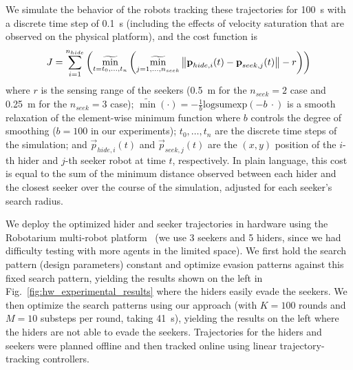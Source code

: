 We simulate the behavior of the robots tracking these trajectories for \SI{100}{s} with a discrete time step of \SI{0.1}{s} (including the effects of velocity saturation that are observed on the physical platform), and the cost function is
\begin{align*}
    J = \sum_{i=1}^{n_{hide}}\left( \mathop{\widetilde{\min}}_{t = t_0, \ldots, t_{n}} \left( \mathop{\widetilde{\min}}_{j=1, \ldots, n_{seek}}\left\lVert\boldsymbol{\mathbf{p}}_{hide, i}(t) - \boldsymbol{\mathbf{p}}_{seek, j}(t)\right\rVert - r \right) \right)
\end{align*}
%
where $r$ is the sensing range of the seekers (\SI{0.5}{m} for the $n_{seek} = 2$ case and \SI{0.25}{m} for the $n_{seek}=3$ case); $\widetilde{\min}(\cdot) = -\frac{1}{b}\text{logsumexp}(-b\ \cdot)$ is a smooth relaxation of the element-wise minimum function where $b$ controls the degree of smoothing ($b=100$ in our experiments); $t_0, \ldots, t_{n}$ are the discrete time steps of the simulation; and $\vec{p}_{hide, i}(t)$ and $\vec{p}_{seek, j}(t)$ are the $(x, y)$ position of the $i$-th hider and $j$-th seeker robot at time $t$, respectively. In plain language, this cost is equal to the sum of the minimum distance observed between each hider and the closest seeker over the course of the simulation, adjusted for each seeker's search radius.

We deploy the optimized hider and seeker trajectories in hardware using the Robotarium multi-robot platform~\cite{wilsonRobotariumGloballyImpactful2020} (we use 3 seekers and 5 hiders, since we had difficulty testing with more agents in the limited space). We first hold the search pattern (design parameters) constant and optimize evasion patterns against this fixed search pattern, yielding the results shown on the left in Fig.~\ref{fig:hw_experimental_results} where the hiders easily evade the seekers. We then optimize the search patterns using our approach (with $K=100$ rounds and $M=10$ substeps per round, taking \SI{41}{s}), yielding the results on the left where the hiders are not able to evade the seekers. Trajectories for the hiders and seekers were planned offline and then tracked online using linear trajectory-tracking controllers.

